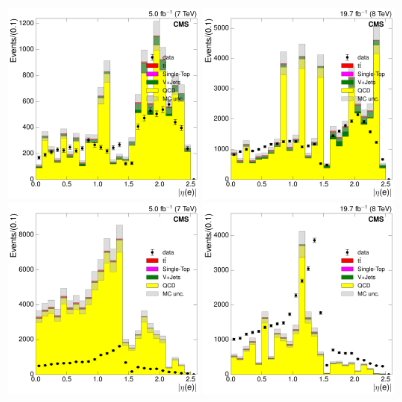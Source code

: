 \begin{figure}[hbtp]
    \centering
      \includegraphics[width=0.45\textwidth]{Chapters/04_Analysis/04b_XSections/images/control_plots/before_fit/7TeV/qcd_plots/QCD_electron_AbsEta_conversion_control_region_0btag}\hfill
      \includegraphics[width=0.45\textwidth]{Chapters/04_Analysis/04b_XSections/images/control_plots/before_fit/8TeV/qcd_plots/QCD_electron_AbsEta_conversion_control_region_0btag}\\
      \includegraphics[width=0.45\textwidth]{Chapters/04_Analysis/04b_XSections/images/control_plots/before_fit/7TeV/qcd_plots/QCD_electron_AbsEta_non_iso_control_region_0btag}\hfill
      \includegraphics[width=0.45\textwidth]{Chapters/04_Analysis/04b_XSections/images/control_plots/before_fit/8TeV/qcd_plots/QCD_electron_AbsEta_non_iso_control_region_0btag}\\

\end{figure}

